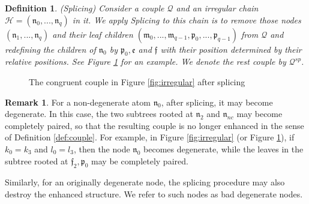 \documentclass[UTF-8,reqno]{amsart}
\numberwithin{equation}{section}
\newtheorem{definition}[theorem]{Definition}
\theoremstyle{definition}
\newtheorem{remark}[theorem]{Remark}
\begin{document}
 \begin{definition}
      (Splicing) Consider a couple $\mathcal{Q}$ and an irregular chain  $\mathcal{H}=(\mathfrak{n}_0,...,\mathfrak{n}_q)$ in it. We apply Splicing to this chain is to remove those nodes $(\mathfrak{n}_1,...,\mathfrak{n}_q)$ and their leaf
children $(\mathfrak{m}_0,...,\mathfrak{m}_{q-1},\mathfrak{p}_0,...,\mathfrak{p}_{q-1})$ from $\mathcal{Q}$ and redefining the children of $\mathfrak{n}_0$ by $\mathfrak{p}_0,\mathfrak{e}$ and $\mathfrak{f}$
  with their position determined by  their
 relative positions.  See Figure \ref{fig:splicing} for an example. We denote the rest couple by $\mathcal{Q}^{sp}$.
 \end{definition}

\begin{figure}
\begin{subfigure}%
\centering
{}
\end{subfigure}
\caption{The congruent couple in Figure \ref{fig:irregular} after splicing}
\label{fig:splicing}
\end{figure}


\begin{remark}
 For a non-degenerate atom $\mathfrak{n}_0$, after splicing, it may become degenerate. In this case, the two subtrees rooted at $\mathfrak{n}_2$ and $\mathfrak{n}_{nc}$ may become completely paired, so that the resulting couple is no longer enhanced in the sense of Definition \ref{def:couple}.
For example, in Figure \ref{fig:irregular} (or Figure \ref{fig:splicing}), if $k_0=k_3$ and $l_0=l_3$, then the node $\mathfrak{n}_0$ becomes degenerate, while the leaves in the subtree rooted at ${\mathfrak{f}_2, \mathfrak{p}_{0}}$ may be completely paired.

Similarly, for an originally degenerate node, the splicing procedure may also destroy the enhanced structure. We refer to such nodes as bad degenerate nodes.

\end{remark}  
\end{document}
